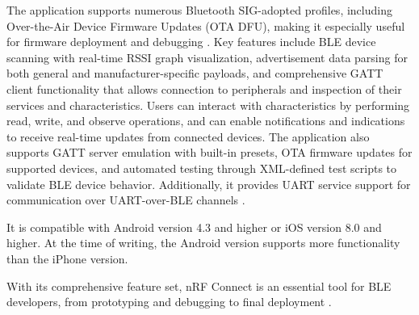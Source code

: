 The application supports numerous Bluetooth SIG-adopted profiles, including Over-the-Air Device Firmware Updates (OTA DFU), making it especially useful for firmware deployment and debugging \cite{buildingBLEsystems}. Key features include BLE device scanning with real-time RSSI graph visualization, advertisement data parsing for both general and manufacturer-specific payloads, and comprehensive GATT client functionality that allows connection to peripherals and inspection of their services and characteristics. Users can interact with characteristics by performing read, write, and observe operations, and can enable notifications and indications to receive real-time updates from connected devices. The application also supports GATT server emulation with built-in presets, OTA firmware updates for supported devices, and automated testing through XML-defined test scripts to validate BLE device behavior. Additionally, it provides UART service support for communication over UART-over-BLE channels \cite{buildingBLEsystems}.

It is compatible with Android version 4.3 and higher or iOS version 8.0 and higher. At the time of writing, the Android version supports more functionality than the iPhone version.

With its comprehensive feature set, nRF Connect is an essential tool for BLE developers, from prototyping and debugging to final deployment \cite{buildingBLEsystems}.